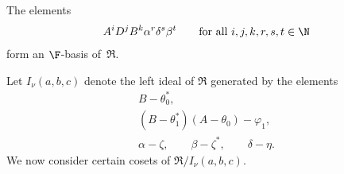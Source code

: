 \begin{Lemma}[{\cite[Theorem 5.1]{SH:2017-1}}]\label{lem:basisURA}
The elements
\begin{gather*}
A^i D^j B^k \alpha^r \delta^s \beta^t\qquad \hbox{for all $i,j,k,r,s,t\in \N$}\label{eq:basisURA}
\end{gather*}
form an $\F$-basis of~$\Re$.
\end{Lemma}

Let $I_\nu(a,b,c)$ denote the left ideal of $\Re$ generated by the elements
\begin{gather}
B-\theta_0^*,\label{U1}\\
(B-\theta_1^*)(A-\theta_0)-\varphi_1,\label{U2}\\
\alpha-\zeta,\qquad\beta-\zeta^*,\qquad\delta-\eta.
\label{U3}
\end{gather}
We now consider certain cosets of $\Re/I_\nu(a,b,c)$.

